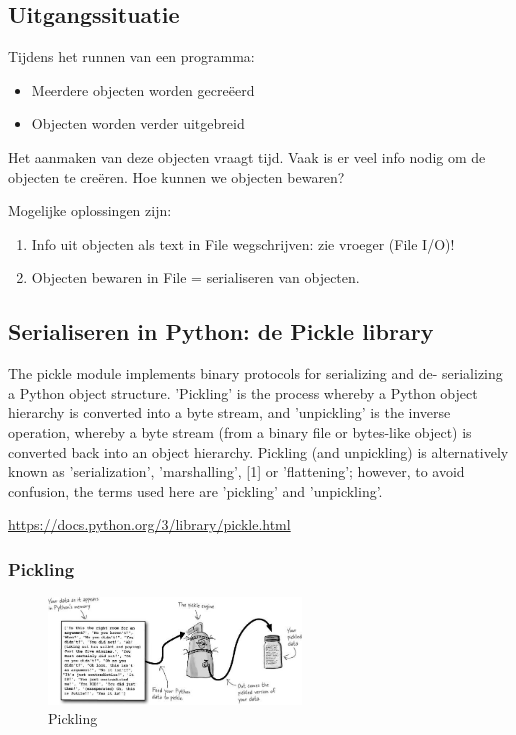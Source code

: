 \documentclass{article}
\begin{document}
\subsection{Uitgangssituatie}

Tijdens het runnen van een programma:

\begin{itemize}
    \item Meerdere objecten worden gecreëerd
    \item Objecten worden verder uitgebreid
\end{itemize}

Het aanmaken van deze objecten vraagt tijd. Vaak is er veel info nodig
om de objecten te creëren. Hoe kunnen we objecten bewaren?

Mogelijke oplossingen zijn:

\begin{enumerate}
    \item Info uit objecten als text in File wegschrijven: zie vroeger (File I/O)!
    \item Objecten bewaren in File = serialiseren van objecten.
\end{enumerate}

\subsection{Serialiseren in Python: de Pickle library}

The pickle module implements binary protocols for serializing and de-
serializing a Python object structure. 'Pickling' is the process whereby
a Python object hierarchy is converted into a byte stream, and
'unpickling' is the inverse operation, whereby a byte stream (from a
binary file or bytes-like object) is converted back into an object
hierarchy. Pickling (and unpickling) is alternatively known as
'serialization', 'marshalling', [1] or 'flattening'; however, to avoid
confusion, the terms used here are 'pickling' and 'unpickling'.

\url{https://docs.python.org/3/library/pickle.html}

\subsubsection{Pickling}

\begin{figure}[H]
    \centering
    \includegraphics[width=0.6\textwidth]{pickling.png}
    \caption{Pickling}
\end{figure}
\end{document}
